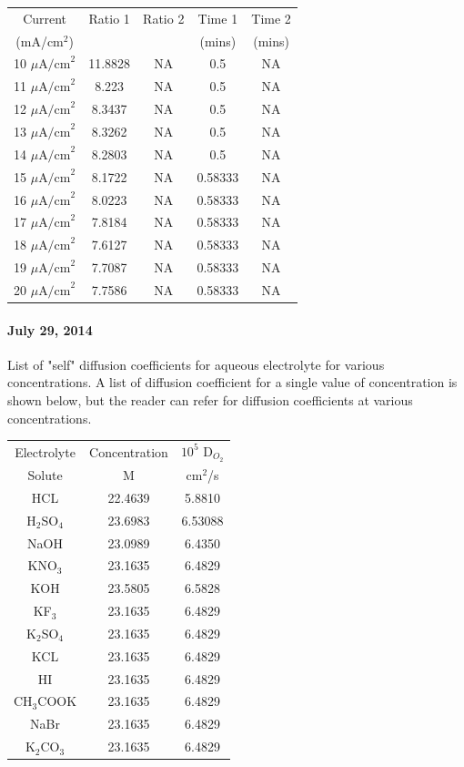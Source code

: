 \documentclass[12pt]{book}
\begin{document}
\begin{center}
	\begin{tabular}{ |c| |c| c  ||c| c|}
		\hline
		Current		& Ratio 1	&	Ratio 2	&	Time 1	&	Time 2  \\
		(mA/cm$^2$)	&			&			&	(mins)	&	(mins) \\ \hline
		10 $\mu\textrm{A/cm}^2$  &	11.8828   &	NA	&	0.5	&	NA	\\
		11 $\mu\textrm{A/cm}^2$  &	8.223	&	NA	&	0.5	&	NA	\\
		12 $\mu\textrm{A/cm}^2$  &	8.3437	&	NA	&	0.5	&	NA	\\
		13 $\mu\textrm{A/cm}^2$  &	8.3262	&	NA	&	0.5	&	NA	\\
		14 $\mu\textrm{A/cm}^2$  &	8.2803	&	NA	&	0.5	&	NA	\\
		15 $\mu\textrm{A/cm}^2$  &	8.1722	&	NA	&	0.58333	&	NA	\\
		16 $\mu\textrm{A/cm}^2$  &	8.0223	&	NA	&	0.58333	&	NA	\\
		17 $\mu\textrm{A/cm}^2$  &	7.8184	&	NA	&	0.58333	&	NA	\\
		18 $\mu\textrm{A/cm}^2$  &	7.6127	&	NA	&	0.58333	&	NA	\\
		19 $\mu\textrm{A/cm}^2$  &	7.7087	&	NA	&	0.58333	&	NA	\\
		20 $\mu\textrm{A/cm}^2$  &	7.7586	&	NA	&	0.58333	&	NA	\\
		
		\hline
	\end{tabular}
\end{center}
\paragraph{July 29, 2014}
List of "self" diffusion coefficients for aqueous electrolyte for various concentrations. A list of diffusion coefficient for a single value of concentration is shown below, but the reader can refer \cite{McCall1965} for diffusion coefficients at various concentrations.
\begin{center}
	\begin{tabular}{ |c| |c| c| }
		\hline
		Electrolyte& Concentration  & $10^5$ D$_{O_2}$  \\
		Solute & M &  cm$^2$/s   \\\hline\hline
		HCL & 22.4639  & 5.8810     \\
		H$_2$SO$_4$& 23.6983 & 6.53088     \\
		NaOH & 23.0989  & 6.4350    \\
		KNO$_3$ & 23.1635 & 6.4829  \\
		KOH & 23.5805 & 6.5828  \\
		KF$_3$ & 23.1635 & 6.4829  \\
		K$_2$SO$_4$ & 23.1635 & 6.4829  \\
		KCL & 23.1635 & 6.4829  \\
		HI & 23.1635 & 6.4829  \\
		CH$_3$COOK & 23.1635 & 6.4829  \\
		NaBr & 23.1635 & 6.4829  \\
		K$_2$CO$_3$ & 23.1635 & 6.4829  \\
		\hline
	\end{tabular}
\end{center}
\end{document}

